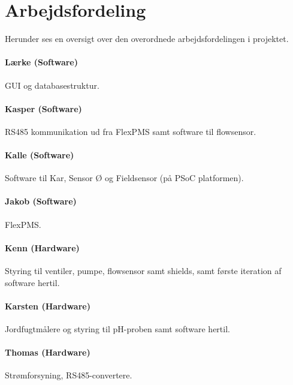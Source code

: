 \chapter{Arbejdsfordeling}
Herunder ses en oversigt over den overordnede arbejdsfordelingen i projektet.

\subsubsection{Lærke (Software)}
GUI og databasestruktur.

\subsubsection{Kasper (Software)}
RS485 kommunikation ud fra FlexPMS samt software til flowsensor.

\subsubsection{Kalle (Software)}
Software til Kar, Sensor Ø og Fieldsensor (på PSoC platformen).

\subsubsection{Jakob (Software)}
FlexPMS.

\subsubsection{Kenn (Hardware)}
Styring til ventiler, pumpe, flowsensor samt shields, samt første iteration af software hertil.

\subsubsection{Karsten (Hardware)}
Jordfugtmålere og styring til pH-proben samt software hertil.

\subsubsection{Thomas (Hardware)}
Strømforsyning, RS485-convertere.
